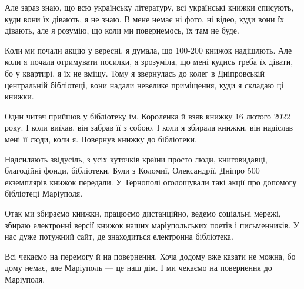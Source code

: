 \begin{qqquote}
Але зараз знаю, що всю українську літературу, всі українські книжки списують,
куди вони їх дівають, я не знаю. В мене немає ні фото, ні відео, куди вони їх
дівають, але я розумію, що коли ми повернемось, їх там не буде.	
\end{qqquote}

Коли ми почали акцію у вересні, я думала, що 100-200 книжок надішлють. Але коли
я почала отримувати посилки, я зрозуміла, що мені кудись треба їх дівати, бо у
квартирі, я їх не вміщу. Тому я звернулась до колег в Дніпровській центральній
бібліотеці, вони надали невелике приміщення, куди я складаю ці книжки.

Один читач прийшов у бібліотеку ім. Короленка й взяв книжку 16 лютого 2022
року. І коли виїхав, він забрав її з собою. І коли я збирала книжки, він
надіслав мені її сюди, коли я. Повернув книжку до бібліотеки.

Надсилають звідусіль, з усіх куточків країни просто люди, книговидавці,
благодійні фонди, бібліотеки. Були з Коломиї, Олександрії, Дніпро 500
екземплярів книжок передали. У Тернополі оголошували такі акції про допомогу
бібліотеці Маріуполя.

Отак ми збираємо книжки, працюємо дистанційно, ведемо соціальні мережі, збираю
електронні версії книжок наших маріупольських поетів і письменників. У нас дуже
потужний сайт, де знаходиться електронна бібліотека.

\begin{qqquote}
Всі чекаємо на перемогу й на повернення. Хоча додому вже казати не можна, бо
дому немає, але Маріуполь — це наш дім. І ми чекаємо на повернення до
Маріуполя.	
\end{qqquote}
